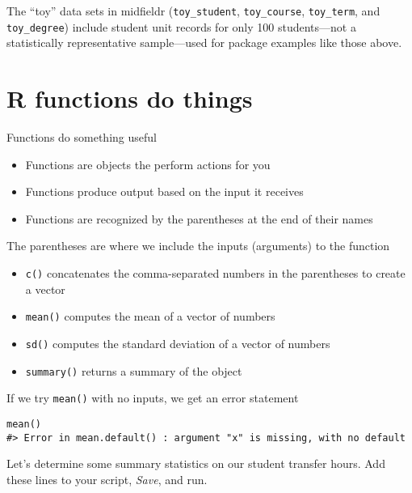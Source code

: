 \documentclass[
]{book}
\providecommand{\tightlist}{%
  \setlength{\itemsep}{0pt}\setlength{\parskip}{0pt}}
\begin{document}
The ``toy'' data sets in midfieldr (\texttt{toy\_student}, \texttt{toy\_course}, \texttt{toy\_term}, and \texttt{toy\_degree}) include student unit records for only 100 students---not a statistically representative sample---used for package examples like those above.

\hypertarget{r-functions-do-things}{%
\section{R functions do things}\label{r-functions-do-things}}

Functions do something useful

\begin{itemize}
\tightlist
\item
  Functions are objects the perform actions for you
\item
  Functions produce output based on the input it receives
\item
  Functions are recognized by the parentheses at the end of their names
\end{itemize}

The parentheses are where we include the inputs (arguments) to the function

\begin{itemize}
\tightlist
\item
  \texttt{c()} concatenates the comma-separated numbers in the parentheses to create a vector
\item
  \texttt{mean()} computes the mean of a vector of numbers
\item
  \texttt{sd()} computes the standard deviation of a vector of numbers
\item
  \texttt{summary()} returns a summary of the object
\end{itemize}

If we try \texttt{mean()} with no inputs, we get an error statement

\begin{verbatim}
mean()
#> Error in mean.default() : argument "x" is missing, with no default
\end{verbatim}

Let's determine some summary statistics on our student transfer hours. Add these lines to your script, \emph{Save}, and run.
\end{document}
